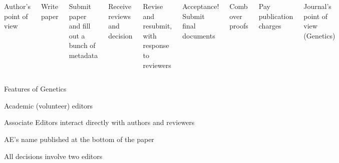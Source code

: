 \documentclass[aspectratio=169,12pt,t]{beamer}
\begin{document}
\begin{frame}{}

  \begin{columns}

    \color{title} Author's point of view

{\footnotesize

  \bi
\item Write paper
\item Submit paper and fill out a bunch of metadata
\item Receive reviews and decision
\item Revise and resubmit, with response to reviewers
\item Acceptance! Submit final documents
\item Comb over proofs
\item Pay publication charges
  \ei
}


    \color{title} Journal's point of view ({\lolit Genetics})


  \end{columns}

\end{frame}





\begin{frame}{Features of Genetics}

  \bbi
\item Academic (volunteer) editors
\item Associate Editors interact directly with authors and reviewers
\item AE's name published at the bottom of the paper
\item All decisions involve two editors
  \ei


\end{frame}
\end{document}
